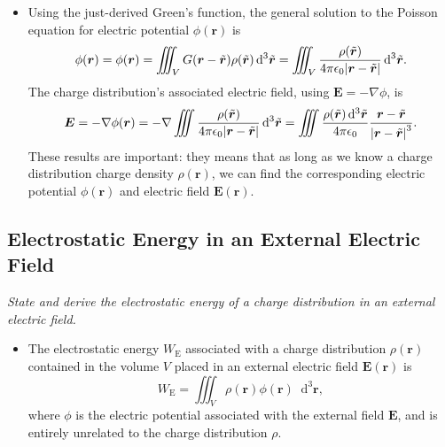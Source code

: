 \documentclass[11pt, a4paper]{article}
\newcommand{\diff}{\mathop{}\!\mathrm{d}} %
\newcommand{\dr}{\diff^{3} \r}  %
\newcommand{\dtr}{\diff^{3} \tilde{\r}}  %
\renewcommand{\vec}[1]{\bm{#1}} %
\renewcommand{\t}[1]{\tilde{#1}} %
\renewcommand{\r}{\vec{r}}
\newcommand{\E}{\vec{E}} %
\newcommand{\ee}{\epsilon_{0}}  %
\renewcommand{\grad}{\nabla}
\begin{document}
\begin{itemize}
	\item  Using the just-derived Green's function, the general solution to the Poisson equation for electric potential $ \phi(\r) $  is
	\begin{equation*}
		\phi(\r) = \phi(\r) = \iiint_{V} G(\r - \t{\r})\rho(\t{\r}) \dtr = \iiint_{V} \frac{\rho(\t{\r})}{4\pi \ee \abs{\r - \t{\r}}}\dtr.
	\end{equation*}
    The charge distribution's associated electric field, using $ \E = - \grad \phi $, is
	\begin{equation*}
		\E = - \grad \phi(\r) = - \grad \iiint \frac{\rho(\t{\r})}{4\pi \ee \abs{\r - \t{\r}}}\dtr = \iiint \frac{\rho(\t{\r})\dtr}{4\pi \ee} \frac{\r - \t{\r}}{\abs{\r - \t{\r}}^{3}}.
	\end{equation*}
    These results are important: they means that as long as we know a charge distribution charge density $ \rho(\r) $, we can find the corresponding electric potential $ \phi(\r) $ and electric field $ \E(\r) $. 
	
	
\end{itemize}

\subsection{Electrostatic Energy in an External Electric Field}
\textit{State and derive the electrostatic energy of a charge distribution in an external electric field.}

\begin{itemize}
    \item The electrostatic energy $ W_{\text{E}} $ associated with a charge distribution $ \rho(\r) $ contained in the volume $ V $ placed in an external electric field $ \E(\r) $ is
    \begin{equation*}
        W_{\text{E}} = \iiint_{V} \rho(\r) \phi(\r) \dr,
    \end{equation*}
    where $ \phi $ is the electric potential associated with the external field $ \E $, and is entirely unrelated to the charge distribution $ \rho $.
    
\end{itemize}
\end{document}
